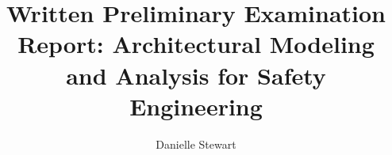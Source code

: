 \documentclass{sig-alternate-05-2015}
\begin{document}

\newcommand{\stateequiv}{\equiv_{s}}
\newcommand{\traceequiv}{\equiv_{\sigma}}
\newcommand{\ta}{\text{TA}}
\newcommand{\cta}{\text{TA$_{C}$}}
\newcommand{\tta}{\text{TA$_{T}$}}
\newcommand{\ucalg}{\texttt{\small{IVC\_UC}}}
\newcommand{\ucbfalg}{\texttt{\small{IVC\_UCBF}}}
\renewcommand{\abstract}{\noindent {\sc \textbf{\large {Abstract}}}\\}


\title{Written Preliminary Examination Report: Architectural Modeling and Analysis for Safety Engineering}
%
\author{
%
%
\alignauthor
Danielle Stewart\\
       \\
       \\
       \\
       }



\maketitle
\end{document}
